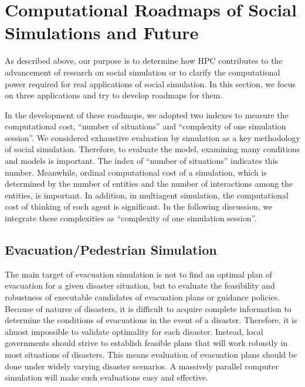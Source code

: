 \section{Computational Roadmaps of Social Simulations and Future}
\label{sec:Computational Roadmaps of Social Simulations}

As described above,
our purpose is to determine how HPC contributes
to the advancement of research on social simulation or
to clarify the computational power required
for real applications of social simulation.
In this section, we focus on three applications and try
to develop roadmaps for them.

In the development of these roadmaps, 
we adopted two indexes to measure the computational cost,
``number of situations'' and ``complexity of one simulation session''.
We considered exhaustive evaluation by simulation as 
a key methodology of social simulation.
Therefore, to evaluate the model,
examining many conditions and models is important.
The index of ``number of situations'' indicates this number.
Meanwhile,
ordinal computational cost of a simulation,
which is determined by the number of entities and the number
of interactions among the entities,
is important.
In addition, in multiagent simulation,
the computational cost of thinking of each agent is significant.
In the following discussion, we integrate these complexities
as ``complexity of one simulation session''.

\subsection{Evacuation/Pedestrian Simulation}

The main target of evacuation simulation is not
to find an optimal plan of evacuation for a given disaster situation,
but to evaluate the feasibility and robustness of executable candidates
of evacuation plans or guidance policies.
Because of natures of disasters, it is difficult to acquire complete information
to determine the conditions of evacuations in the event of a disaster.
Therefore, it is almost impossible to validate optimality for
each disaster.
Instead, local governments should strive to establish feasible plans
that will work robustly in most situations of disasters.
This means evaluation of evacuation plans should be done
under widely varying disaster scenarios.
A massively parallel computer simulation 
will make such evaluations easy and effective.

